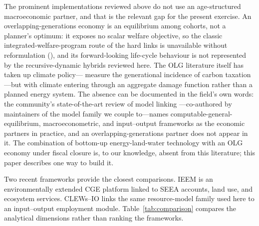 The prominent implementations reviewed above do not use an age-structured macroeconomic
partner, and that is the relevant gap for the present exercise. An overlapping-generations economy is an
equilibrium among cohorts, not a planner's optimum: it exposes no scalar welfare
objective, so the classic integrated-welfare-program route of the hard links is
unavailable without reformulation
(), and its forward-looking life-cycle behaviour is not represented by
the recursive-dynamic hybrids reviewed here. The OLG literature itself has taken up climate
policy---\citet{kotlikoff_2021} measure the generational incidence of carbon
taxation---but with climate entering through an aggregate damage function rather
than a planned energy system. The absence can be documented in the field's own
words: the community's state-of-the-art review of model linking
\citep{keppo_linking_2026}---co-authored by maintainers of the model family we
couple to---names computable-general-equilibrium, macroeconometric, and
input--output frameworks as the economic partners in practice, and an
overlapping-generations partner does not appear in it.
The combination of bottom-up energy-land-water
technology with an OLG economy under fiscal closure is, to our knowledge, absent
from this literature; this paper describes one way to build it.

Two recent frameworks provide the closest comparisons. IEEM
\citep{banerjee_ieem_2020} is an environmentally extended CGE platform linked to SEEA
accounts, land use, and ecosystem services. CLEWs--IO
\citep{bararzadeh_clews_io_2026} links the same resource-model family used here to an
input--output employment module. Table~\ref{tab:comparison} compares the analytical
dimensions rather than ranking the frameworks.

